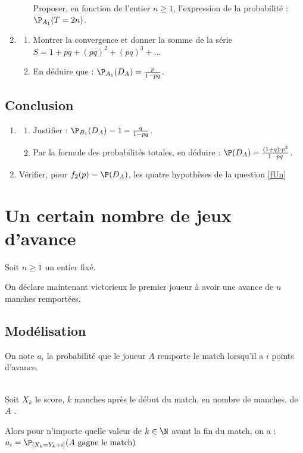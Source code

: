 \documentclass[12pt]{article}
\begin{document}
\begin{enumerate}[resume]
\begin{objetGauche}[-.5\baselineskip]
\begin{enumerate}[resume]
          Proposer, en fonction de l'entier $n\ge 1$, l'expression de la probabilité : \quad $\P_{A_1}(T=2n)$.
      \end{enumerate}
    \end{objetGauche}
    \moinsLigne
  \item
    \begin{enumerate}
      \item Montrer la convergence et donner la somme de la série \quad $S = 1 + pq + (pq)^2 + (pq)^3 + \ldots$
      \item En déduire que : \quad $\P_{A_1}(D_{A}) = \frac{p}{1-pq}$.
    \end{enumerate}
\end{enumerate}
\moinsLigne
\subsection{Conclusion}
\begin{enumerate}[resume]
  \item
    \begin{enumerate}
      \item Justifier : \quad $\P_{B_1}(D_{A}) = 1-\frac{q}{1-pq}$.
      \item Par la formule des probabilités totales, en déduire : \quad $\P(D_{A}) = \frac{(1+q)\cdot p^2}{1-pq}$.
    \end{enumerate}
  \item Vérifier, pour $f_2(p) = \P(D_{A})$, les quatre hypothèses de la question \ref{fUn}
\end{enumerate}

\section{Un certain nombre de jeux d'avance}
Soit $n \ge 1$ un entier fixé.

On déclare maintenant victorieux le premier joueur à avoir une avance de $n$ manches remportées.
\subsection{Modélisation}

On note $a_i$ la probabilité  que le joueur $A$ remporte le match  lorsqu'il a $i$ points d'avance. \quad {}

\begin{example}~\\
  Soit $X_k$  le score, $k$ manches après le début du match, en nombre de manches, de $A$ .

  Alors pour n'importe quelle valeur de $k \in \N$ avant la fin du match, on a : \quad $a_i = \P_{[X_k=Y_k+i]}(A \text{ gagne le match})$
\end{example}
\end{document}
